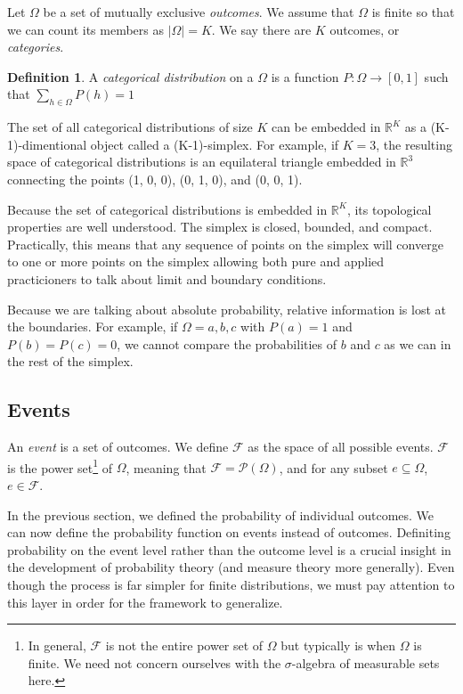 \documentclass[twoside]{article}
\theoremstyle{plain}%
\theoremstyle{definition}
\newtheorem{definition}{Definition}[section]
\theoremstyle{remark}
\begin{document}
Let \(\Omega\) be a set of mutually exclusive \textit{outcomes}. We assume that \(\Omega\) is finite so that we can count its members as \(|\Omega| = K\). We say there are \(K\) outcomes, or \textit{categories}.

\begin{definition}
A \textit{categorical distribution} on a \(\Omega\) is a function \(P: \Omega \rightarrow [0, 1]\) such that \(\sum_{h \in \Omega} P(h) = 1\)
\end{definition}

The set of all categorical distributions of size \(K\) can be embedded in \(\mathbb{R}^K\) as a (K-1)-dimentional object called a (K-1)-simplex. For example, if \(K = 3\), the resulting space of categorical distributions is an equilateral triangle embedded in \(\mathbb{R}^3\) connecting the points (1, 0, 0), (0, 1, 0), and (0, 0, 1).

Because the set of categorical distributions is embedded in \(\mathbb{R}^K\),
its topological properties are well understood. The simplex is closed, bounded,
and compact. Practically, this means that any sequence of points on the
simplex will converge to one or more points on the simplex allowing both pure and applied practicioners to talk about limit and boundary conditions.

Because we are talking about absolute probability, relative information is lost at the boundaries. For example, if \(\Omega = {a, b, c}\) with \(P(a) = 1\) and \(P(b) = P(c) = 0\), we cannot compare the probabilities of \(b\) and \(c\) as we can in the rest of the simplex.

\subsection{Events}

An \textit{event} is a set of outcomes. We define \(\mathcal{F}\) as the space of all possible events. \(\mathcal{F}\) is the power set\footnote{In general, \(\mathcal{F}\) is not the entire power set of \(\Omega\) but typically is when \(\Omega\) is finite. We need not concern ourselves with the \(\sigma\)-algebra of measurable sets here.} of \(\Omega\), meaning that \(\mathcal{F} = \mathcal{P}(\Omega)\), and for any subset \(e \subseteq \Omega\), \(e \in \mathcal{F}\).

In the previous section, we defined the probability of individual outcomes. We
can now define the probability function on events instead of outcomes.
Definiting probability on the event level rather than the outcome level is a
crucial insight in the development of probability theory (and measure theory more generally). Even though the process is far simpler for finite distributions, we must pay attention to this layer in order for the framework to generalize.
\end{document}
